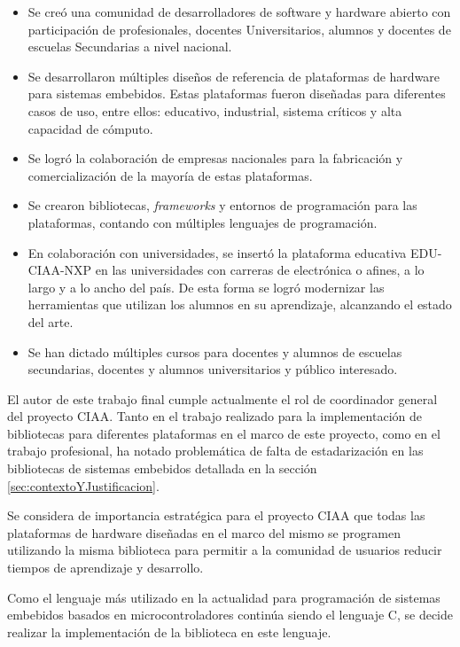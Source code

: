 \begin{itemize}
\item
Se creó una comunidad de desarrolladores de software y hardware abierto con participación de profesionales, docentes Universitarios, alumnos y docentes de escuelas Secundarias a nivel nacional.
\item
Se desarrollaron múltiples diseños de referencia de plataformas de hardware para sistemas embebidos. Estas plataformas fueron diseñadas para diferentes casos de uso, entre ellos: educativo, industrial, sistema críticos y alta capacidad de cómputo.
\item
Se logró la colaboración de empresas nacionales para la fabricación y comercialización de la mayoría de estas plataformas.
\item
Se crearon bibliotecas, \emph{frameworks} y entornos de programación para las plataformas, contando con múltiples lenguajes de programación.
\item
En colaboración con universidades, se insertó la plataforma educativa EDU-CIAA-NXP en las universidades con carreras de electrónica o afines, a lo largo y a lo ancho del país. De esta forma se logró modernizar las herramientas que utilizan los alumnos en su aprendizaje, alcanzando el estado del arte.
\item
Se han dictado múltiples cursos para docentes y alumnos de escuelas secundarias, docentes y alumnos universitarios y público interesado.
\end{itemize}

El autor de este trabajo final cumple actualmente el rol de coordinador general del proyecto CIAA. Tanto en el trabajo realizado para la implementación de bibliotecas para diferentes plataformas en el marco de este proyecto, como en el trabajo profesional, ha notado problemática de falta de estadarización en las bibliotecas de sistemas embebidos detallada en la sección \ref{sec:contextoYJustificacion}.

Se considera de importancia estratégica para el proyecto CIAA que todas las plataformas de hardware diseñadas en el marco del mismo se programen utilizando la misma biblioteca para permitir a la comunidad de usuarios reducir tiempos de aprendizaje y desarrollo.

Como el lenguaje más utilizado en la actualidad para programación de sistemas embebidos basados en microcontroladores continúa siendo el lenguaje C, se decide realizar la implementación de la biblioteca en este lenguaje.
